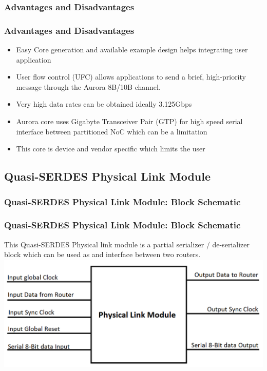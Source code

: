 \subsubsection{Advantages and Disadvantages}
\begin{frame}
\frametitle{Advantages and Disadvantages}
\begin{itemize}
\item{Easy Core generation and available example design helps integrating user application}
\item{User flow control (UFC) allows applications to send a brief, high-priority message through the Aurora 8B/10B channel.}
\item{Very high data rates can be obtained ideally 3.125Gbps}
\item{Aurora core uses Gigabyte Transceiver Pair (GTP) for high speed serial interface between partitioned NoC which can be a limitation}
\item{This core is device and vendor specific which limits the user}
\end{itemize}
\end{frame}



\subsection{Quasi-SERDES Physical Link Module}
\subsubsection{Quasi-SERDES Physical Link Module: Block Schematic}
\begin{frame}
\frametitle{Quasi-SERDES Physical Link Module: Block Schematic}
This Quasi-SERDES Physical link module is a partial serializer / de-serializer block which can be used as and interface between two routers.\\
	\centering
	\includegraphics[scale=0.35]{./figs/physicalModule}
\end{frame}

